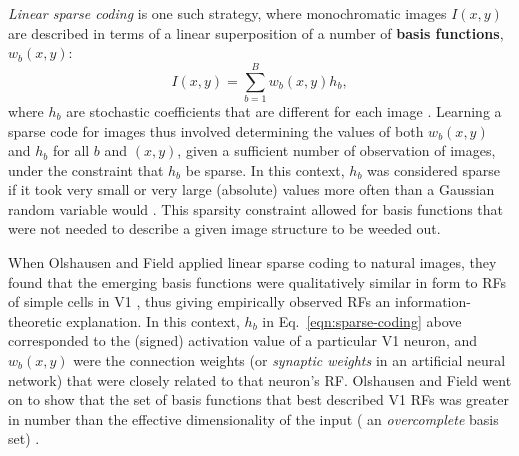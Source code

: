 \emph{Linear sparse coding} is one such strategy,
where monochromatic images $I(x,y)$
are described in terms of a linear superposition of
a number of \textbf{basis functions},
$w_b(x,y)$:
\begin{equation}
I(x,y) = \sum^B_{b=1} w_b(x,y) h_b,
\label{eqn:sparse-coding}
\end{equation}
where $h_b$ are stochastic coefficients that are different for each image
\cite{OlshausenField1996,Hyvarinen2001}.
Learning a sparse code for images thus involved determining
the values of both $w_b(x,y)$ and $h_b$ for all $b$ and $(x,y)$,
given a sufficient number of observation of images,
under the constraint that $h_b$ be sparse.
In this context, $h_b$ was considered sparse if it took very small
or very large (absolute) values more often than a Gaussian random
variable would \cite{Hyvarinen2001}.
This sparsity constraint allowed for basis functions that were not
needed to describe a given image structure to be weeded out.


When Olshausen and Field applied linear sparse coding 
to natural images,
they found that the emerging basis functions 
were qualitatively similar in form
to \acp{RF} of simple cells in \ac{V1} 
\cite{OlshausenField1996,OlshausenField1997},
thus giving empirically observed \acp{RF} 
an information-theoretic explanation.
In this context, $h_b$ in Eq.~\ref{eqn:sparse-coding} above
corresponded to the (signed) activation value of a particular \ac{V1}
neuron, and $w_b(x,y)$ were the connection weights
(or \emph{synaptic weights} in an artificial neural network)
that were closely related to that neuron's \ac{RF}.
Olshausen and Field went on to show that 
the set of basis functions that best described \ac{V1} \acp{RF} 
was greater in number than the effective
dimensionality of the input
( an \emph{overcomplete} basis set) 
\cite{OlshausenField1997}.


